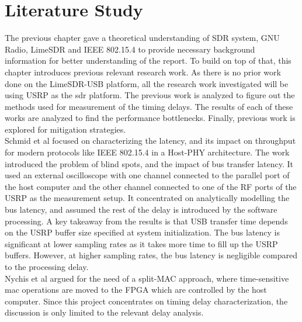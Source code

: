 \chapter{Literature Study}

The previous chapter gave a theoretical understanding of \ac{SDR} system, GNU Radio, LimeSDR and IEEE 802.15.4 to provide necessary background information for better understanding of the report.
To build on top of that, this chapter introduces previous relevant research work.
As there is no prior work done on the LimeSDR-USB platform, all the research work investigated will be using USRP as the \ac{sdr} platform.
The previous work is analyzed to figure out the methods used for measurement of the timing delays.
The results of each of these works are analyzed to find the performance bottlenecks.
Finally, previous work is explored for mitigation strategies.\\

Schmid et al \cite{schmid_experimental_2007} focused on characterizing the latency, and its impact on throughput for modern protocols like IEEE 802.15.4 in a Host-PHY architecture.
The work introduced the problem of blind spots, and the impact of bus transfer latency.
It used an external oscilloscope with one channel connected to the parallel port of the host computer and the other channel connected to one of the RF ports of the USRP as the measurement setup.
It concentrated on analytically modelling the bus latency, and assumed the rest of the delay is introduced by the software processing.
A key takeaway from the results is that USB transfer time depends on the USRP buffer size specified at system initialization.
The bus latency is significant at lower sampling rates as it takes more time to fill up the USRP buffers.
However, at higher sampling rates, the bus latency is negligible compared to the processing delay.
\\

Nychis et al \cite{nychis_enabling_nodate} argued for the need of a split-MAC approach, where time-sensitive \ac{mac} operations are moved to the \ac{FPGA} which are controlled by the host computer.
Since this project concentrates on timing delay characterization, the discussion is only limited to the relevant delay analysis.\\

